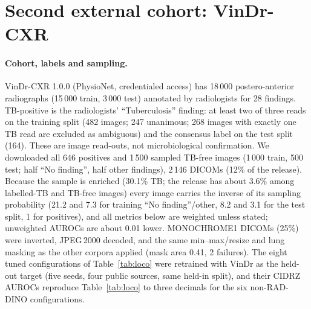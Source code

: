 \documentclass[10pt,a4paper]{article}
\begin{document}
\section{Second external cohort: VinDr-CXR}\label{sec:vindr}
\paragraph{Cohort, labels and sampling.} VinDr-CXR 1.0.0 (PhysioNet, credentialed access) has 18\,000 postero-anterior radiographs (15\,000 train, 3\,000 test) annotated by radiologists for 28 findings. TB-positive is the radiologists' ``Tuberculosis'' finding: at least two of three reads on the training split (482 images; 247 unanimous; 268 images with exactly one TB read are excluded as ambiguous) and the consensus label on the test split (164). These are image read-outs, not microbiological confirmation. We downloaded all 646 positives and 1\,500 sampled TB-free images (1\,000 train, 500 test; half ``No finding'', half other findings), 2\,146 DICOMs (12\% of the release). Because the sample is enriched (30.1\% TB; the release has about 3.6\% among labelled-TB and TB-free images) every image carries the inverse of its sampling probability (21.2 and 7.3 for training ``No finding''/other, 8.2 and 3.1 for the test split, 1 for positives), and all metrics below are weighted unless stated; unweighted AUROCs are about 0.01 lower. MONOCHROME1 DICOMs (25\%) were inverted, JPEG\,2000 decoded, and the same min--max/resize and lung masking as the other corpora applied (mask area 0.41, 2 failures). The eight tuned configurations of Table~\ref{tab:loco} were retrained with VinDr as the held-out target (five seeds, four public sources, same held-in split), and their CIDRZ AUROCs reproduce Table~\ref{tab:loco} to three decimals for the six non-RAD-DINO configurations.
\end{document}

